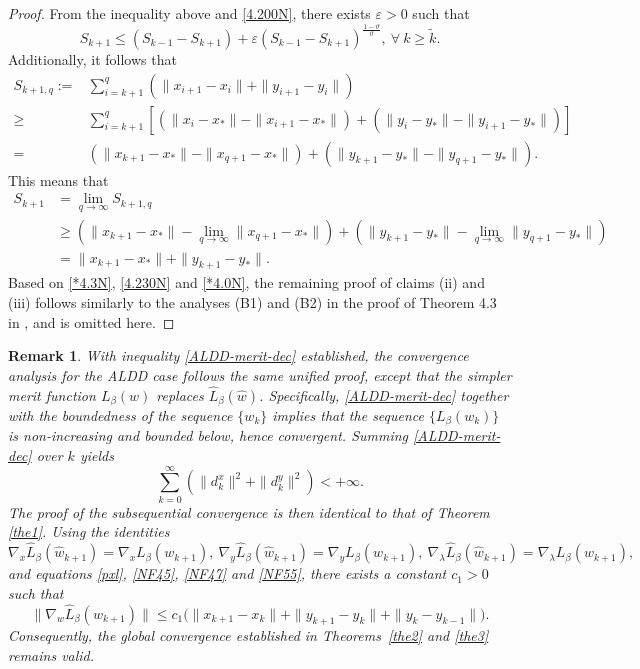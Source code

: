 \documentclass[pdflatex,sn-mathphys-num]{sn-jnl}%
\theoremstyle{thmstyleone}%
\theoremstyle{thmstyletwo}%
\newtheorem{remark}{Remark}%
\theoremstyle{thmstylethree}%
\begin{document}
\begin{proof}
From the inequality above and \eqref{4.200N}, there exists $\varepsilon>0$ such that
\begin{equation}\label{4.230N}
S_{{k}+1} \leq (S_{k-1}-S_{k+1}) +\varepsilon (S_{k-1}-S_{k+1})^{\frac{1-\vartheta}{\vartheta}},~\forall~k\geq \tilde{k}.
\end{equation}
Additionally, it follows that
\[\begin{aligned}
S_{k+1, q}:=&\sum_{i=k+1}^{q}(\|{x}_{i+1}-x_{i}\|+\|{y}_{i+1}-y_{i}\|) \\
\geq& \sum_{i=k+1}^{q}[(\|{x}_{i}-x_{*}\|-\|{x}_{i+1}-x_{*}\|)+(\|{y}_{i}-y_{*}\|-\|{y}_{i+1}-y_{*}\|)]\\
=&(\|{x}_{k+1}-x_{*}\|-\|{x}_{q+1}-x_{*}\|)+(\|{y}_{k+1}-y_{*}\|-\|{y}_{q+1}-y_{*}\|).
\end{aligned}\]
This means that
\begin{align}
S_{k+1}&= \lim_{q\to\infty} S_{k+1, q} \nonumber\\
&\geq  (\|{x}_{k+1}-x_{*}\|-\lim_{q\to\infty}\|{x}_{q+1}-x_{*}\|)+(\|{y}_{k+1}-y_{*}\|-\lim_{q\to\infty}\|{y}_{q+1}-y_{*}\|) \nonumber\\
&=\|{x}_{k+1}-x_{*}\|+\|{y}_{k+1}-y_{*}\|.\label{*4.0N}
\end{align}
Based on \eqref{*4.3N}, \eqref{4.230N} and \eqref{*4.0N}, the remaining proof of claims (ii) and (iii) follows similarly to the analyses (B1) and (B2) in the proof of Theorem 4.3 in \cite{JLY21}, and is omitted here.
\end{proof}




	\begin{remark}\label{remark4}
		With inequality \eqref{ALDD-merit-dec} established, the convergence analysis for the ALDD case follows the same unified proof, except that the simpler merit function $L_{\beta}(w)$ replaces $\hat{L}_{\beta}(\hat{w})$. Specifically, \eqref{ALDD-merit-dec} together with the boundedness of the sequence $\{w_k\}$ implies that the sequence $\{L_{\beta}(w_k)\}$ is non-increasing and bounded below, hence convergent. Summing \eqref{ALDD-merit-dec} over $k$ yields
		\[
		\sum_{k=0}^\infty(\|d_{k}^x\|^2+\|d_{k}^y\|^2)<+\infty.
		\]
		The proof of the subsequential convergence is then identical to that of Theorem \ref{the1}. Using the identities
		\[
		\nabla_x \hat{L}_{\beta}(\hat{w}_{k+1})=\nabla_x L_{\beta}(w_{k+1}),~\nabla_y \hat{L}_{\beta}(\hat{w}_{k+1})=\nabla_y L_{\beta}(w_{k+1}),~\nabla_\lambda \hat{L}_{\beta}(\hat{w}_{k+1})=\nabla_\lambda L_{\beta}(w_{k+1}),
		\]
		and equations \eqref{pxl}, \eqref{NF45}, \eqref{NF47} and \eqref{NF55}, there exists a constant $c_1 > 0$ such that
		\[
		\|\nabla_{w} \hat{L}_{\beta}(w_{k+1})\| \leq c_1 \bigl(\|x_{k+1}-x_k\| + \|y_{k+1}-y_k\| + \|y_k - y_{k-1}\|\bigr).
		\]
		Consequently, the global convergence established in Theorems~\ref{the2} and \ref{the3} remains valid.
	\end{remark}
\end{document}
